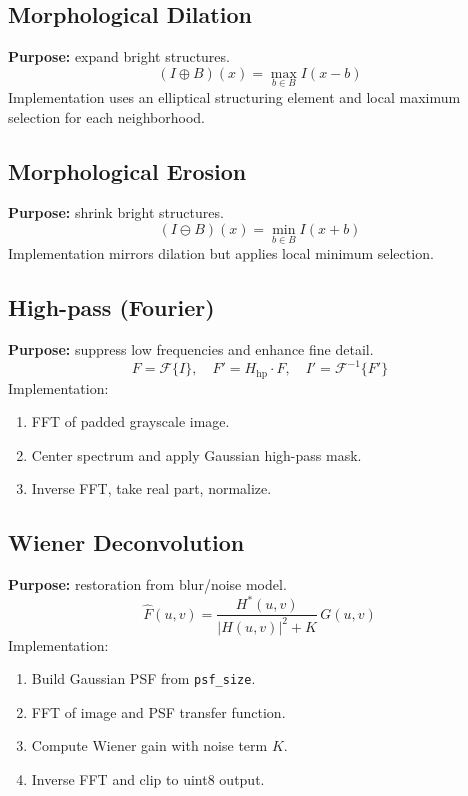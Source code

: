 \documentclass[11pt,a4paper]{article}
\begin{document}
\subsection{Morphological Dilation}
\textbf{Purpose:} expand bright structures.
\[
(I\oplus B)(x)=\max_{b\in B} I(x-b)
\]
Implementation uses an elliptical structuring element and local maximum selection for each neighborhood.

\subsection{Morphological Erosion}
\textbf{Purpose:} shrink bright structures.
\[
(I\ominus B)(x)=\min_{b\in B} I(x+b)
\]
Implementation mirrors dilation but applies local minimum selection.

\subsection{High-pass (Fourier)}
\textbf{Purpose:} suppress low frequencies and enhance fine detail.
\[
F=\mathcal{F}\{I\},\quad F' = H_{\text{hp}}\cdot F,\quad I'=\mathcal{F}^{-1}\{F'\}
\]
Implementation:
\begin{enumerate}[leftmargin=1.2cm]
  \item FFT of padded grayscale image.
  \item Center spectrum and apply Gaussian high-pass mask.
  \item Inverse FFT, take real part, normalize.
\end{enumerate}

\subsection{Wiener Deconvolution}
\textbf{Purpose:} restoration from blur/noise model.
\[
\hat{F}(u,v)=\frac{H^*(u,v)}{|H(u,v)|^2 + K}\,G(u,v)
\]
Implementation:
\begin{enumerate}[leftmargin=1.2cm]
  \item Build Gaussian PSF from \texttt{psf\_size}.
  \item FFT of image and PSF transfer function.
  \item Compute Wiener gain with noise term \(K\).
  \item Inverse FFT and clip to uint8 output.
\end{enumerate}
\end{document}
